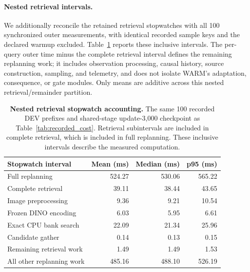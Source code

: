 \paragraph{Nested retrieval intervals.}
We additionally reconcile the retained retrieval stopwatches with all 100 synchronized outer measurements, with identical recorded sample keys and the declared warmup excluded.
Table~\ref{tab:retrieval_phase_cost} reports these inclusive intervals.
The per-query outer time minus the complete retrieval interval defines the remaining replanning work; it includes observation processing, causal history, source construction, sampling, and telemetry, and does not isolate WARM's adaptation, consequence, or gate modules.
Only means are additive across this nested retrieval/remainder partition.

\begin{table}[htbp]
\centering\small
\caption{\textbf{Nested retrieval stopwatch accounting.} The same 100 recorded DEV prefixes and shared-stage update-3,000 checkpoint as Table~\ref{tab:recorded_cost}. Retrieval subintervals are included in complete retrieval, which is included in full replanning. These inclusive intervals describe the measured computation.}
\label{tab:retrieval_phase_cost}
\begin{tabular}{@{}lrrr@{}}
\toprule
Stopwatch interval & Mean (ms) & Median (ms) & p95 (ms) \\
\midrule
Full replanning & 524.27 & 530.06 & 565.22 \\
Complete retrieval & 39.11 & 38.44 & 43.65 \\
\quad Image preprocessing & 9.36 & 9.21 & 10.54 \\
\quad Frozen DINO encoding & 6.03 & 5.95 & 6.61 \\
\quad Exact CPU bank search & 22.09 & 21.34 & 25.96 \\
\quad Candidate gather & 0.14 & 0.13 & 0.15 \\
\quad Remaining retrieval work & 1.49 & 1.49 & 1.53 \\
All other replanning work & 485.16 & 488.10 & 526.19 \\
\bottomrule
\end{tabular}
\end{table}

